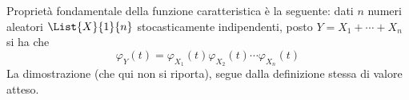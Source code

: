 \documentclass{subfiles}
\begin{document}
Proprietà fondamentale della funzione caratteristica è la seguente: dati $n$ numeri aleatori \(\List{X}{1}{n}\) stocasticamente indipendenti,
posto $Y = X_{1} + \cdots + X_{n}$ si ha che
$$
    \varphi_{Y}(t) = \varphi_{X_{1}}(t) \varphi_{X_{2}}(t) \cdots \varphi_{X_{n}}(t)
$$
La dimostrazione (che qui non si riporta), segue dalla definizione stessa di valore atteso.
\end{document}
